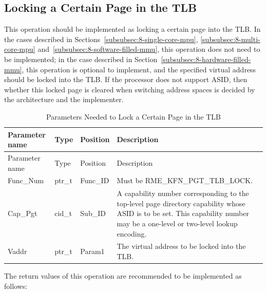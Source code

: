 \subsection{Locking a Certain Page in the TLB}\label{subsec:8-lock-page-in-tlb}

This operation should be implemented as locking a certain page into the TLB. In the cases described in Sections~\ref{subsubsec:8-single-core-mpu}, \ref{subsubsec:8-multi-core-mpu} and~\ref{subsubsec:8-software-filled-mmu}, this operation does not need to be implemented; in the case described in Section~\ref{subsubsec:8-hardware-filled-mmu}, this operation is optional to implement, and the specified virtual address should be locked into the TLB. If the processor does not support ASID, then whether this locked page is cleared when switching address spaces is decided by the architecture and the implementer.

\begin{xltabular}{\textwidth}{@{}>{\hsize\raggedright\arraybackslash}X>{\hsize\raggedright\arraybackslash}X>{\hsize\raggedright\arraybackslash}X>{\hsize\raggedright\arraybackslash}X@{}}
\caption{Parameters Needed to Lock a Certain Page in the TLB}\label{tab:8-11-lock-page-in-tlb-parameters}\\
\toprule
Parameter name & Type & Position & Description\tabularnewline
\endfirsthead
\toprule
Parameter name & Type & Position & Description\tabularnewline
\midrule
\endhead
\bottomrule
\endlastfoot
Func\_Num & ptr\_t & Func\_ID & Must be RME\_KFN\_PGT\_TLB\_LOCK.\tabularnewline
Cap\_Pgt & cid\_t & Sub\_ID &
A capability number corresponding to the top-level page directory capability whose ASID is to be set. This capability number may be a one-level or two-level lookup encoding.\tabularnewline
Vaddr & ptr\_t & Param1 & The virtual address to be locked into the TLB.\tabularnewline
\end{xltabular}
\nopagebreak[4]

The return values of this operation are recommended to be implemented as follows:

